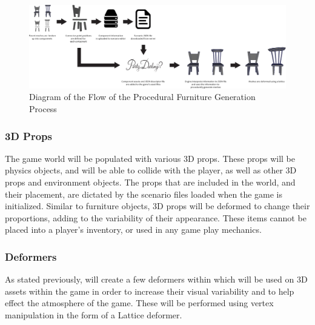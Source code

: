 \begin{figure}[H]
	\centering\includegraphics[width=0.8\linewidth]{images/proceduralFurnitureProcess_Diagram}
	\caption{Diagram of the Flow of the Procedural Furniture Generation Process}
	\label{fig:furniture}
\end{figure}

\subsubsection{3D Props}
The game world will be populated with various 3D props. These props will be physics objects, and will be able to collide with the player, as well as other 3D props and environment objects. The props that are included in the world, and their placement, are dictated by the scenario files loaded when the game is initialized. Similar to furniture objects, 3D props will be deformed to change their proportions, adding to the variability of their appearance. These items cannot be placed into a player's inventory, or used in any game play mechanics.

\subsubsection{Deformers}
As stated previously, \ourteam{} will create a few deformers within \ourengine{} which will be used on 3D assets within the game in order to increase their visual variability and to help effect the atmosphere of the game. These will be performed using vertex manipulation in the form of a Lattice deformer.
